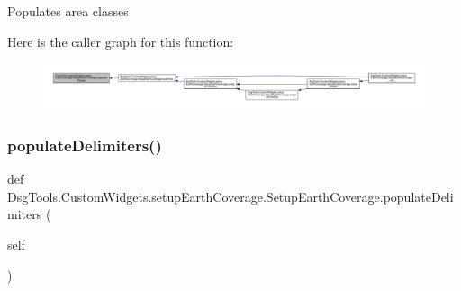 \begin{DoxyVerb}Populates area classes
\end{DoxyVerb}
 Here is the caller graph for this function\+:
\nopagebreak
\begin{figure}[H]
\begin{center}
\leavevmode
\includegraphics[width=350pt]{class_dsg_tools_1_1_custom_widgets_1_1setup_earth_coverage_1_1_setup_earth_coverage_a164b8e379820f6c2def0c0e8efbb4e08_icgraph}
\end{center}
\end{figure}
\mbox{\label{class_dsg_tools_1_1_custom_widgets_1_1setup_earth_coverage_1_1_setup_earth_coverage_a72841ab90499e0ff727f324428fab893}} 
\subsubsection{\texorpdfstring{populate\+Delimiters()}{populateDelimiters()}}
{\footnotesize\ttfamily def Dsg\+Tools.\+Custom\+Widgets.\+setup\+Earth\+Coverage.\+Setup\+Earth\+Coverage.\+populate\+Delimiters (\begin{DoxyParamCaption}\item[{}]{self }\end{DoxyParamCaption})}

